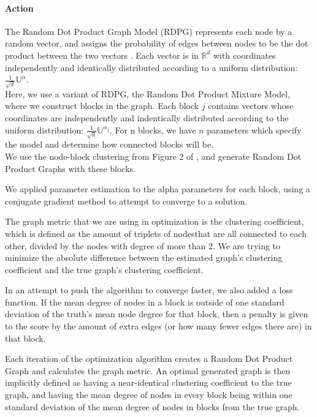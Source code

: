 \documentclass[12pt]{article}
\begin{document}
\paragraph{Action}
The Random Dot Product Graph Model (RDPG) represents each node by a random
vector, and assigns the probability of edges between nodes to be the dot product
between the two vectors \cite{young}.
Each vector is in $\mathbb{R}^{d}$ with coordinates independently and
identically distributed according to a uniform distribution:
$\frac{1}{\sqrt{d}}\mathbb{U}^{\alpha}$.\\

Here, we use a variant of RDPG, the Random Dot Product Mixture Model, where we
construct blocks in the graph.  Each block $j$ contains vectors whose 
coordinates are independently and indentically distributed according to the
uniform distribution: $\frac{1}{\sqrt{d}}\mathbb{U}^{\alpha_{j}}$.  For n
blocks, we have $n$ parameters which specify the model and determine how
connected blocks will be.\\

We use the node-block clustering from Figure 2 of \cite{pavlovic}, and generate
Random Dot Product Graphs with these blocks.

We applied parameter estimation to the alpha parameters for each block, using a
conjugate gradient method to attempt to converge to a solution.

The graph metric that we are using in optimization is the clustering 
coefficient, which is defined \cite{pavlovic} as the amount of triplets of nodesthat are all connected to each other, divided by the nodes with degree of more 
than 2.  We are trying to minimize the absolute difference between the estimated
graph's clustering coefficient and the true graph's clustering coefficient.

In an attempt to push the algorithm to converge faster, we also added a loss
function.  If the mean degree of nodes in a block is outside of one standard
deviation of the truth's mean node degree for that block, then a penalty is
given to the score by the amount of extra edges (or how many fewer edges there
are) in that block.

Each iteration of the optimization algorithm creates a Random Dot Product Graph
and calculates the graph metric.  An optimal generated graph is then implicitly 
defined as having a near-identical clustering coefficient to the true graph, and
having the mean degree of nodes in every block being within one standard
deviation of the mean degree of nodes in blocks from the true graph.
\end{document}
